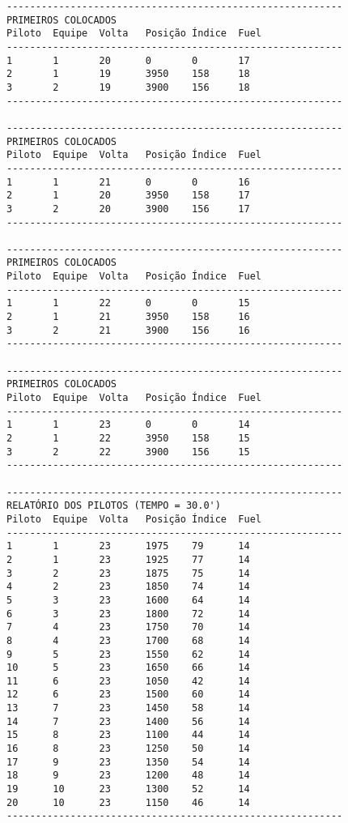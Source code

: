 \documentclass[12pt]{article}
\begin{document}
\begin{verbatim}
----------------------------------------------------------
PRIMEIROS COLOCADOS
Piloto  Equipe  Volta   Posição Índice  Fuel
----------------------------------------------------------
1       1       20      0       0       17
2       1       19      3950    158     18
3       2       19      3900    156     18
----------------------------------------------------------

----------------------------------------------------------
PRIMEIROS COLOCADOS
Piloto  Equipe  Volta   Posição Índice  Fuel
----------------------------------------------------------
1       1       21      0       0       16
2       1       20      3950    158     17
3       2       20      3900    156     17
----------------------------------------------------------

----------------------------------------------------------
PRIMEIROS COLOCADOS
Piloto  Equipe  Volta   Posição Índice  Fuel
----------------------------------------------------------
1       1       22      0       0       15
2       1       21      3950    158     16
3       2       21      3900    156     16
----------------------------------------------------------

----------------------------------------------------------
PRIMEIROS COLOCADOS
Piloto  Equipe  Volta   Posição Índice  Fuel
----------------------------------------------------------
1       1       23      0       0       14
2       1       22      3950    158     15
3       2       22      3900    156     15
----------------------------------------------------------

----------------------------------------------------------
RELATÓRIO DOS PILOTOS (TEMPO = 30.0')
Piloto  Equipe  Volta   Posição Índice  Fuel
----------------------------------------------------------
1       1       23      1975    79      14
2       1       23      1925    77      14
3       2       23      1875    75      14
4       2       23      1850    74      14
5       3       23      1600    64      14
6       3       23      1800    72      14
7       4       23      1750    70      14
8       4       23      1700    68      14
9       5       23      1550    62      14
10      5       23      1650    66      14
11      6       23      1050    42      14
12      6       23      1500    60      14
13      7       23      1450    58      14
14      7       23      1400    56      14
15      8       23      1100    44      14
16      8       23      1250    50      14
17      9       23      1350    54      14
18      9       23      1200    48      14
19      10      23      1300    52      14
20      10      23      1150    46      14
----------------------------------------------------------


\end{verbatim}
\end{document}
